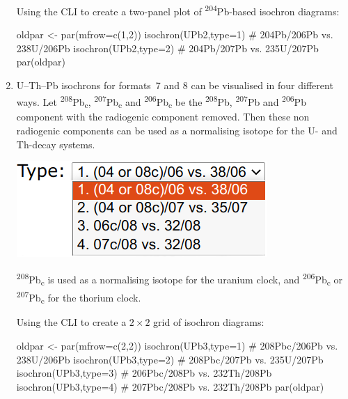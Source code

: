 \begin{refsection}
\begin{enumerate}
\noindent Using the CLI to create a two-panel plot of
\textsuperscript{204}Pb-based isochron diagrams:
\begin{script}
oldpar <- par(mfrow=c(1,2))
isochron(UPb2,type=1) # 204Pb/206Pb vs. 238U/206Pb
isochron(UPb2,type=2) # 204Pb/207Pb vs. 235U/207Pb
par(oldpar)
\end{script}

\item U--Th--Pb isochrons for formats~7 and 8 can be visualised in
  four different ways. Let \textsuperscript{208}Pb\textsubscript{c},
  \textsuperscript{207}Pb\textsubscript{c} and
  \textsuperscript{206}Pb\textsubscript{c} be the
  \textsuperscript{208}Pb, \textsuperscript{207}Pb and
  \textsuperscript{206}Pb component with the radiogenic component
  removed. Then these non radiogenic components can be used as a
  normalising isotope for the U- and Th-decay systems.

\noindent\begin{minipage}[t]{.3\linewidth}
\strut\vspace*{-\baselineskip}\newline
\includegraphics[width=\linewidth]{../figures/UPbFormats78isochronMenu.png}
\end{minipage}
\begin{minipage}[t]{.7\linewidth}
  \textsuperscript{208}Pb\textsubscript{c} is used as a normalising
  isotope for the uranium clock, and
  \textsuperscript{206}Pb\textsubscript{c} or
  \textsuperscript{207}Pb\textsubscript{c} for the thorium clock.
\end{minipage}
  
\noindent Using the CLI to create a ${2}\times{2}$ grid of isochron
diagrams:
\begin{script}
oldpar <- par(mfrow=c(2,2))
isochron(UPb3,type=1) # 208Pbc/206Pb vs. 238U/206Pb
isochron(UPb3,type=2) # 208Pbc/207Pb vs. 235U/207Pb
isochron(UPb3,type=3) # 206Pbc/208Pb vs. 232Th/208Pb
isochron(UPb3,type=4) # 207Pbc/208Pb vs. 232Th/208Pb
par(oldpar)
\end{script}


\end{enumerate}
\end{refsection}
